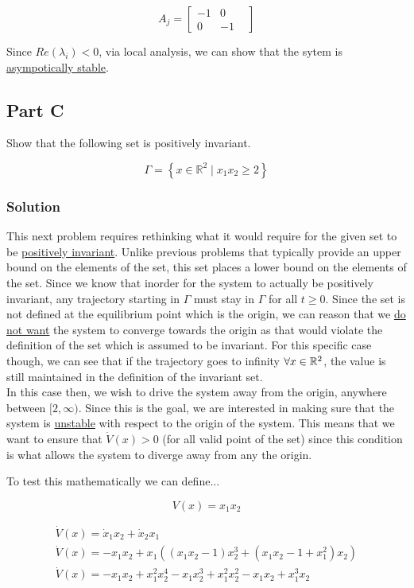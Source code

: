$$
A_j =
\begin{bmatrix}
  -1 & 0 & \\
  0 & -1 &
\end{bmatrix}
$$

\noindent Since $Re(\lambda_i) < 0$, via local analysis, we can show that the sytem is \underline{asympotically stable}.

\subsection*{Part C}

Show that the following set is positively invariant.

$$
\Gamma=\left\{x \in \mathbb{R}^{2} \mid x_{1} x_{2} \geq 2\right\}
$$



\subsubsection*{Solution}
This next problem requires rethinking what it would require for the given set to be \underline{positively invariant}. Unlike previous problems that typically provide an upper bound on the elements of the set, this set places a lower bound on the elements of the set. Since we know that inorder for the system to actually be positively invariant, any trajectory starting in $\Gamma$ must stay in $\Gamma$ for all $t\geq 0$. Since the set is not defined at the equilibrium point which is the origin, we can reason that we \underline{do not want} the system to converge towards the origin as that would violate the definition of the set which is assumed to be invariant. For this specific case though, we can see that if the trajectory goes to infinity $\forall x \in \mathbb{R}^2$, the value is still maintained in the definition of the invariant set. \\

\noindent In this case then, we wish to drive the system away from the origin, anywhere between $[2, \infty)$. Since this is the goal, we are interested in making sure that the system is \underline{unstable} with respect to the origin of the system. This means that we want to ensure that $\dot{V}(x)>0$ (for all valid point of the set) since this condition is what allows the system to diverge away from any the origin.


To test this mathematically we can define...

$$
V(x) = x_1x_2
$$


$$
\begin{array}{l}
\dot{V}(x) = \dot{x}_1x_2 + \dot{x}_2x_1 \\
\dot{V}(x) = -x_1x_2 + x_1 \left( (x_1x_2 -1)x_2^3 + (x_1x_2 - 1+ x_1^2)x_2 \right) \\
\dot{V}(x) = -x_1x_2 +x_1^2x_2^4 -x_1x_2^3 + x_1^2x_2^2 - x_1x_2 + x_1^3x_2
\end{array}
$$

